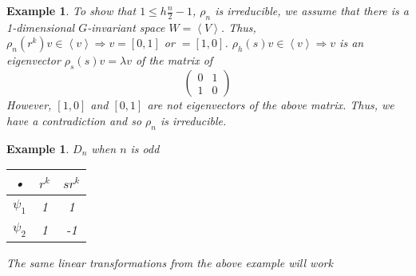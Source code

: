 \documentclass[letterpaper, leqno, 12pt]{article}
\newcommand{\fin}{\qquad \quad \hfill \framebox[1.75mm][l]{\,}}
\providecommand{\ip}[1]{\left\langle #1 \right\rangle}
\theoremstyle{stdthm}
\theoremstyle{stddef}
\newtheorem{eg}[thm]{Example} %
\theoremstyle{stdnonum}
\theoremstyle{stdqands}
\theoremstyle{stdbold}
\begin{document}
\begin{eg}
 To show that $1 \leq h \frac{n}{2} -1$, $\rho_n$ is irreducible, we assume that there is a 1-dimensional $G$-invariant space $W = \ip{V}$. Thus, $\rho_n(r^k)v  \in \ip{v} \Rightarrow  v = [0,1]$ or $ = [1,0]$. $\rho_h(s)v \in \ip{v} \Rightarrow v$  is an eigenvector $\rho_s(s)v = \lambda v$ of the matrix of 
 \[ \left( \begin{array}{cc}
0 & 1 \\ 
1 & 0
\end{array} \right)\]
However, $[1,0]$ and $[0,1]$ are not eigenvectors of the above matrix. Thus, we have a contradiction and so $\rho_n$ is irreducible. 
\end{eg}

\begin{eg} $D_n$ when $n$ is odd
\begin{tabular}{|c|c|c|}
\hline 
• & $r^k$ & $sr^k$ \\ 
\hline 
$\psi_1$ & 1 & 1 \\ 
\hline 
$\psi_2$ & 1 & -1 \\ 
\hline 
\end{tabular} 
The same linear transformations from the above example will work
\end{eg}
\end{document}
